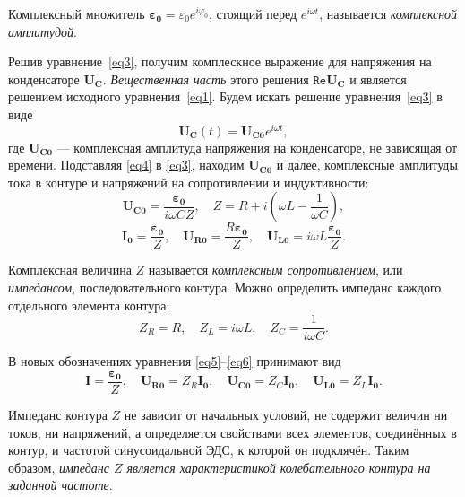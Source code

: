 \documentclass[a4paper, 12pt]{article}
\begin{document}
Комплексный множитель $\mathbf{\varepsilon_0} = \varepsilon_0e^{i\varphi_0}$, стоящий перед $e^{i\omega t}$, называется \textit{комплексной амплитудой}.

Решив уравнение~\eqref{eq3}, получим комплескное выражение для напряжения на конденсаторе $\mathbf{U_C}$. \textit{Вещественная часть} этого решения $\mathtt{Re}\mathbf{U_C}$ и является решением исходного уравнения~\eqref{eq1}. Будем искать решение уравнения~\eqref{eq3} в виде
\begin{equation}\label{eq4}
\mathbf{U_C}(t) = \mathbf{U_{C0}}e^{i\omega t},
\end{equation}
где $\mathbf{U_{C0}}$ --- комплексная амплитуда напряжения на конденсаторе, не зависящая от времени. Подставляя \eqref{eq4} в \eqref{eq3}, находим $\mathbf{U_{C0}}$ и далее, комплексные амплитуды тока в контуре и напряжений на сопротивлении и индуктивности:
\begin{equation}\label{eq5}
\mathbf{U_{C0}} = \frac{\mathbf{\varepsilon_0}}{i\omega CZ}, \quad Z = R + i\left(\omega L - \frac{1}{\omega C}\right),
\end{equation}
\begin{equation}\label{eq6}
\mathbf{I_0} = \frac{\mathbf{\varepsilon_0}}{Z}, \quad \mathbf{U_{R0}} = \frac{R\mathbf{\varepsilon_0}}{Z}, \quad \mathbf{U_{L0}} = i\omega L\frac{\mathbf{\varepsilon_0}}{Z}.
\end{equation}

Комплексная величина $Z$ называется \textit{комплексным сопротивлением}, или \textit{импедансом}, последовательного контура. Можно определить импеданс каждого отдельного элемента контура:
\begin{equation}\label{eq7}
Z_R = R, \quad Z_L = i\omega L, \quad Z_C = \frac{1}{i\omega C}.
\end{equation}

В новых обозначениях уравнения \eqref{eq5}--\eqref{eq6} принимают вид
\begin{equation}\label{eq8}
\mathbf{I} = \frac{\mathbf{\varepsilon_0}}{Z}, \quad \mathbf{U_{R0}} = Z_R\mathbf{I_0}, \quad \mathbf{U_{C0}} = Z_C\mathbf{I_0}, \quad \mathbf{U_{L0}} = Z_L\mathbf{I_0}.
\end{equation}

Импеданс контура $Z$ не зависит от начальных условий, не содержит величин ни токов, ни напряжений, а определяется свойствами всех элементов, соединённых в контур, и частотой синусоидальной ЭДС, к которой он подклячён. Таким образом, \textit{импеданс $Z$ является характеристикой колебательного контура на заданной частоте}.
\end{document}
